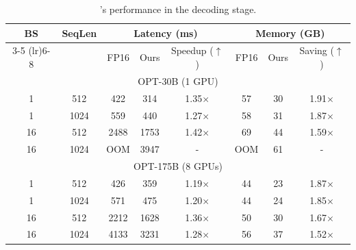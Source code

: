 \begin{table}
\setlength{\tabcolsep}{2.5pt}
\small
\centering
\caption{\method’s performance in the decoding stage.
}
\label{tab:generation-stage}
\small
\begin{tabular}{cccccccc}
\toprule
\multirow{2}{*}{BS} & \multirow{2}{*}{SeqLen} & \multicolumn{3}{c}{Latency (ms)}                       & \multicolumn{3}{c}{Memory (GB)}         \\
\cmidrule(lr){3-5} \cmidrule(lr){6-8}
           &                & FP16                            & Ours & Speedup ($\uparrow$) & FP16        & Ours & Saving ($\uparrow$) \\
           \midrule
\multicolumn{8}{c}{OPT-30B (1 GPU)}        \\
1          & 512            & 422                             & 314         & 1.35$\times$    & 57          & 30          & 1.91$\times$   \\
1          & 1024           & 559                             & 440         & 1.27$\times$    & 58          & 31          & 1.87$\times$   \\
16         & 512            & 2488                            & 1753        & 1.42$\times$    & 69          & 44          & 1.59$\times$   \\
16         & 1024           & OOM                             & 3947        & -       & OOM         & 61          & -      \\
\midrule
\multicolumn{8}{c}{OPT-175B (8 GPUs)}        \\
1          & 512            & 426                             & 359         & 1.19$\times$    & 44          & 23          & 1.87$\times$   \\
1          & 1024           & 571                             & 475         & 1.20$\times$    & 44          & 24          & 1.85$\times$   \\
16         & 512            & 2212                            & 1628        & 1.36$\times$    & 50          & 30          & 1.67$\times$   \\
16         & 1024           & 4133                            & 3231        & 1.28$\times$    & 56          & 37          & 1.52$\times$   \\
\bottomrule
\end{tabular}
\vspace{-1em}
\end{table}
